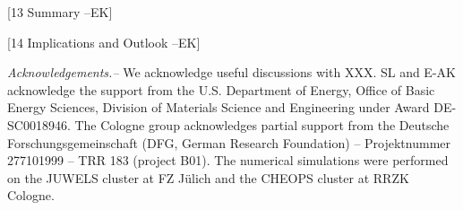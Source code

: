 \documentclass[amsmath,amssymb, aps, prx, longbibliography, twocolumn]{revtex4-1}
\begin{document}
[13 Summary --EK]

[14 Implications and Outlook --EK]



{\it Acknowledgements.--} 
We acknowledge useful discussions with XXX. SL and E-AK acknowledge the support from the U.S. Department of Energy, Office of Basic Energy Sciences, Division of Materials Science and Engineering under Award DE-SC0018946.
The Cologne group acknowledges partial support from the Deutsche Forschungsgemeinschaft (DFG, German Research Foundation) -- Projektnummer 277101999 -- TRR 183 (project B01).
The numerical simulations were performed on the JUWELS cluster at FZ J\"ulich and the CHEOPS cluster at RRZK Cologne.


%
%
\appendix
\end{document}
